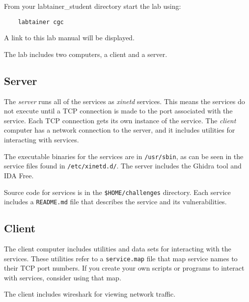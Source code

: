 From your labtainer_student directory start the lab using:
\begin{verbatim}
    labtainer cgc
\end{verbatim}
\noindent A link to this lab manual will be displayed.  

The lab includes two computers, a client and a server.  
\subsection{Server}
The \textit{server} runs all of the services as \textit{xinetd}
services.  This means the services do not execute until a TCP connection is made to the port
associated with the service.  Each TCP connection gets its own instance of the service.  The
\textit{client} computer has a network connection to the server, and it includes utilities for
interacting with services.

The executable binaries for the services are in {\tt /usr/sbin}, as can be seen in the service
files found in {\tt /etc/xinetd.d/}.  The server includes the Ghidra tool and IDA Free.

Source code for services is in the {\tt \$HOME/challenges} directory.  Each service includes a
{\tt README.md} file that describes the service and its vulnerabilities.  

\subsection{Client}
The client computer includes utilities and data sets for interacting with the services.  
These utilities refer to a {\tt service.map} file that map service names to their TCP port numbers.
If you create your own scripts or programs to interact with services, consider using that map.

The client includes wireshark for viewing network traffic.

